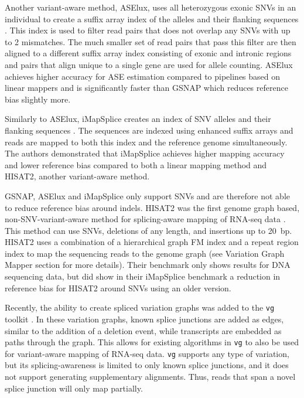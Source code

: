 Another variant-aware method, ASElux, uses all heterozygous exonic SNVs in an individual to create a suffix array index of the alleles and their flanking sequences \cite{Miao2018-ps}. 
This index is used to filter read pairs that does not overlap any SNVs with up to 2 mismatches. 
The much smaller set of read pairs that pass this filter are then aligned to a different suffix array index consisting of exonic and intronic regions and pairs that align unique to a single gene are used for allele counting. 
ASElux achieves higher accuracy for ASE estimation compared to pipelines based on linear mappers and is significantly faster than GSNAP which reduces reference bias slightly more.

Similarly to ASElux, iMapSplice creates an index of SNV alleles and their flanking sequences \cite{Liu_2018}.
The sequences are indexed using enhanced suffix arrays and reads are mapped to both this index and the reference genome simultaneously.
The authors demonstrated that iMapSplice achieves higher mapping accuracy and lower reference bias compared to both a linear mapping method and HISAT2, another variant-aware method.

GSNAP, ASElux and iMapSplice only support SNVs and are therefore not able to reduce reference bias around indels.
HISAT2 was the first genome graph based, non-SNV-variant-aware method for splicing-aware mapping of RNA-seq data \cite{Kim_2019}. 
This method can use SNVs, deletions of any length, and insertions up to 20~bp.
HISAT2 uses a combination of a hierarchical graph FM index and a repeat region index to map the sequencing reads to the genome graph (see Variation Graph Mapper section for more details).
Their benchmark only shows results for DNA sequencing data, but \citeauthor{Liu_2018} did show in their iMapSplice benchmark a reduction in reference bias for HISAT2 around SNVs using an older version.  

Recently, the ability to create spliced variation graphs was added to the \texttt{vg} toolkit \cite{Garrison_2018}. 
In these variation graphs, known splice junctions are added as edges, similar to the addition of a deletion event, while transcripts are embedded as paths through the graph. 
This allows for existing algorithms in \texttt{vg} to also be used for variant-aware mapping of RNA-seq data. 
\texttt{vg} supports any type of variation, but its splicing-awareness is limited to only known splice junctions, and it does not support generating supplementary alignments.
Thus, reads that span a novel splice junction will only map partially.

